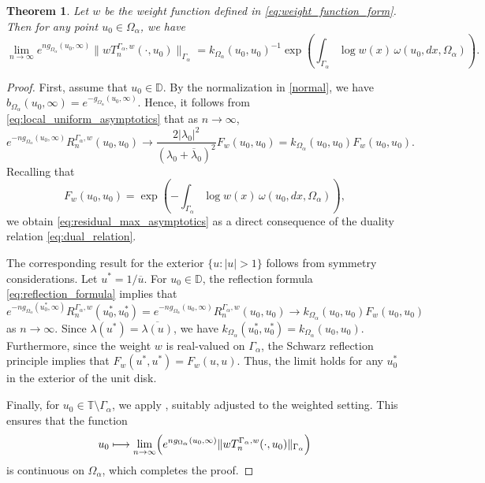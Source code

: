 \documentclass[12pt,oneside,reqno]{amsart}
\newtheorem{theorem}{Theorem}[section]
\theoremstyle{definition}
\numberwithin{equation}{section}
\newcommand{\D}{{\mathbb D}}
\newcommand{\T}{{\mathbb T}}
\begin{document}
\begin{theorem}
	\label{thm:weighted_residual_asymptotics_at_point}
	Let $w$ be the weight function defined in \eqref{eq:weight_function_form}. Then for any point $u_0\in \Omega_\alpha$, we have 	
	\begin{equation}
		\lim_{n\rightarrow \infty}e^{ng_{\Omega_\alpha}(u_0,\infty)}\|wT_n^{\Gamma_{\alpha},w}(\cdot ,u_0)\|_{\Gamma_\alpha} = k_{\Omega_\alpha}(u_0,u_0)^{-1}\exp\left(\int_{\Gamma_\alpha}\log w(x)\,\omega(u_0,dx,\Omega_{\alpha})\right).
		\label{eq:residual_max_asymptotics}
	\end{equation}
\end{theorem}


\begin{proof}
First, assume that $u_0\in \D$. By the normalization in \eqref{normal}, we have $b_{\Omega_\alpha}(u_0,\infty) = e^{-g_{\Omega_\alpha}(u_0,\infty)}$. Hence, it follows from \eqref{eq:local_uniform_asymptotics} that as $n\rightarrow \infty$,
	\[
		e^{-n g_{\Omega_\alpha}(u_0,\infty)} R_n^{\Gamma_{\alpha},w}(u_0,u_0) \longrightarrow \frac{2|\lambda_0|^2}{(\lambda_0+\overline{\lambda}_0)^2} F_w(u_0,u_0) = k_{\Omega_\alpha}(u_0,u_0)F_w(u_0,u_0).
    \]
	Recalling that
	\[F_w(u_0,u_0) = \exp\left(-\int_{\Gamma_\alpha} \log w(x)\,\omega(u_0,dx,\Omega_{\alpha})\right),\]
	we obtain \eqref{eq:residual_max_asymptotics} as a direct consequence of the duality relation \eqref{eq:dual_relation}.
 

The corresponding result for the exterior $\{u: |u|>1\}$ follows from symmetry considerations. Let $u^\ast = 1/\overline{u}$. For $u_0\in \D$, the reflection formula \eqref{eq:reflection_formula} implies that
	\[
	e^{-ng_{\Omega_\alpha}(u_0^\ast,\infty)}R_{n}^{\Gamma_\alpha,w}(u_0^\ast,u_0^\ast) 
	= e^{-ng_{\Omega_\alpha}(u_0,\infty)}{R_{n}^{\Gamma_\alpha,w}(u_0,u_0)} 
	\longrightarrow k_{\Omega_\alpha}(u_0,u_0){F_w(u_0,u_0)}
	\]
	as $n\rightarrow \infty$. Since $\lambda(u^\ast) = \overline{\lambda(u)}$, we have $k_{\Omega_\alpha}(u_0^\ast,u_0^\ast) = k_{\Omega_\alpha}(u_0,u_0)$. Furthermore, since the weight $w$ is real-valued on $\Gamma_\alpha$, the Schwarz reflection principle implies that $F_w(u^\ast,u^\ast) = {F_w(u,u)}$. Thus, the limit holds for any $u_0^\ast$ in the exterior of the unit disk.
		


Finally, for $u_0\in \T\setminus \Gamma_\alpha$, we apply \cite[Lemma 2.7]{eichinger17}, suitably adjusted to the weighted setting. This ensures that the function
    \[
       u_0\longmapsto \lim_{n\rightarrow \infty} \Bigl( e^{ng_{\Omega_\alpha}(u_0,\infty)} \|wT_n^{\Gamma_\alpha, w}(\cdot,u_0)\|_{\Gamma_\alpha} \Bigr)
    \]
    is continuous on $\Omega_\alpha$, which completes the proof.	

\end{proof}
\end{document}
